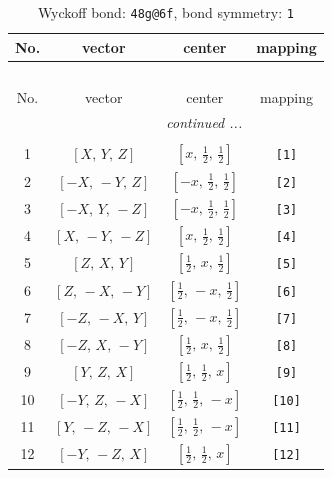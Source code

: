 \documentclass[fleqn,8pt]{jsarticle}
\begin{document}
\begin{longtable}{cccc}
\caption{Wyckoff bond: {\tt 48g@6f}, bond symmetry: {\tt 1}}
 \\
 \hline \hline
No. & vector & center & mapping \\ \hline \endfirsthead

\multicolumn{3}{l}{\tablename\ \thetable{}} \\
 \hline \hline
No. & vector & center & mapping \\ \hline \endhead

 \hline \hline
\multicolumn{3}{r}{\footnotesize\it continued ...} \\ \endfoot

 \hline \hline
\multicolumn{3}{r}{} \\ \endlastfoot

1 & $\left[ X,\, Y,\, Z \right]$ & $\left[ x,\, \frac{1}{2},\, \frac{1}{2} \right]$ & {\tt [1]} \\ \hline
2 & $\left[ - X,\, - Y,\, Z \right]$ & $\left[ - x,\, \frac{1}{2},\, \frac{1}{2} \right]$ & {\tt [2]} \\ \hline
3 & $\left[ - X,\, Y,\, - Z \right]$ & $\left[ - x,\, \frac{1}{2},\, \frac{1}{2} \right]$ & {\tt [3]} \\ \hline
4 & $\left[ X,\, - Y,\, - Z \right]$ & $\left[ x,\, \frac{1}{2},\, \frac{1}{2} \right]$ & {\tt [4]} \\ \hline
5 & $\left[ Z,\, X,\, Y \right]$ & $\left[ \frac{1}{2},\, x,\, \frac{1}{2} \right]$ & {\tt [5]} \\ \hline
6 & $\left[ Z,\, - X,\, - Y \right]$ & $\left[ \frac{1}{2},\, - x,\, \frac{1}{2} \right]$ & {\tt [6]} \\ \hline
7 & $\left[ - Z,\, - X,\, Y \right]$ & $\left[ \frac{1}{2},\, - x,\, \frac{1}{2} \right]$ & {\tt [7]} \\ \hline
8 & $\left[ - Z,\, X,\, - Y \right]$ & $\left[ \frac{1}{2},\, x,\, \frac{1}{2} \right]$ & {\tt [8]} \\ \hline
9 & $\left[ Y,\, Z,\, X \right]$ & $\left[ \frac{1}{2},\, \frac{1}{2},\, x \right]$ & {\tt [9]} \\ \hline
10 & $\left[ - Y,\, Z,\, - X \right]$ & $\left[ \frac{1}{2},\, \frac{1}{2},\, - x \right]$ & {\tt [10]} \\ \hline
11 & $\left[ Y,\, - Z,\, - X \right]$ & $\left[ \frac{1}{2},\, \frac{1}{2},\, - x \right]$ & {\tt [11]} \\ \hline
12 & $\left[ - Y,\, - Z,\, X \right]$ & $\left[ \frac{1}{2},\, \frac{1}{2},\, x \right]$ & {\tt [12]} \\ \hline

\end{longtable}
\end{document}
